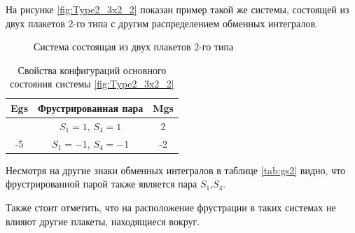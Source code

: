 \documentclass[utf8, babel, sor, jor, amsmath, amssymb, reprint]{elsarticle} %
\begin{document}
На рисунке \eqref{fig:Type2_3x2_2} показан пример такой же системы, состоящей из двух плакетов 2-го типа с другим распределением обменных интегралов.

\begin{figure}[H]
	\centering
	\begin{minipage}{0.3\textwidth}
		\centering
		\caption{Система состоящая из двух плакетов 2-го типа}
		\label{fig:Type2_3x2_2}
	\end{minipage}
\end{figure}


\begin{table}[H]
	\centering
	\begin{tabular}{|c|c|c|}
		\hline
		Egs   &   Фрустрированная пара & Mgs \\
		\hline
		   &  $S_1=1$, $S_4=1$ & 2 \\
		\cline{2-3}
		-5	\multirow{3}{*}{}
		 &   $S_1=-1$, $S_4=-1$ & -2 \\
		\hline
	\end{tabular}
	\caption{Свойства конфигураций основного состояния системы \eqref{fig:Type2_3x2_2}}
	\label{tab:gs2}
\end{table}

Несмотря на другие знаки обменных интегралов в таблице \eqref{tab:gs2} видно, что фрустрированной парой также является пара $S_1$,$S_4$.

Также стоит отметить, что на расположение фрустрации в таких системах  не влияют другие плакеты, находящиеся вокруг.
\end{document}
